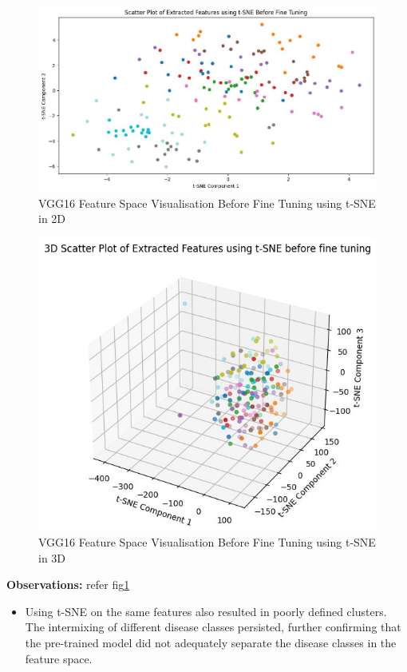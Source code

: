 \begin{figure}
    \centering
    \includegraphics[width=1\linewidth]{graphics//chapter7/vgg feature viz tsne 2d.png}
    \caption{VGG16 Feature Space Visualisation Before Fine Tuning using t-SNE in 2D}
    \label{fig:tsne-bft-2d}
\end{figure}
\begin{figure}
    \centering
    \includegraphics[width=0.75\linewidth]{graphics//chapter7/vgg feature vuz tsne before fine tuning 3d.png}
    \caption{VGG16 Feature Space Visualisation Before Fine Tuning using t-SNE in 3D}
    \label{fig:tsne-bft-3d}
\end{figure}
\textbf{Observations: } refer fig\ref{fig:tsne-bft-2d}
\begin{itemize}
    \item Using t-SNE on the same features also resulted in poorly defined clusters. The intermixing of different disease classes persisted, further confirming that the pre-trained model did not adequately separate the disease classes in the feature space.
\end{itemize}

